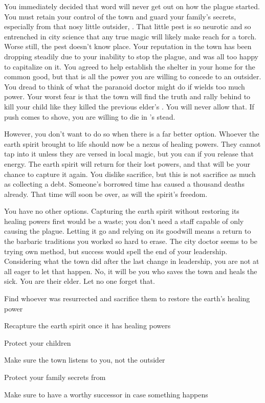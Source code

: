 \documentclass[char]{Pestilence}
\begin{document}
You immediately decided that word will never get out on how the plague started. You must retain your control of the town and guard your family's secrets, especially from that nosy little outsider, \cOutsider{}. That little pest is so neurotic and so entrenched in \cOutsider{\their} city science that any true magic will likely make \cOutsider{\them} reach for a torch. Worse still, the pest doesn't know \cOutsider{\their} place. Your reputation in the town has been dropping steadily due to your inability to stop the plague, and \cOutsider{} was all too happy to capitalize on it. You agreed to help \cOutsider{\them} establish the shelter in your home for the common good, but that is all the power you are willing to concede to an outsider. You dread to think of what the paranoid doctor might do if \cOutsider{\they} wields too much power. Your worst fear is that the town will find the truth and rally behind \cOutsider{\them} to kill your child like they killed the previous elder's \cPlaguebearer{\offspring}. You will never allow that. If push comes to shove, you are willing to die in \cRebel{}'s stead. 

However, you don't want to do so when there is a far better option. Whoever the earth spirit brought to life should now be a nexus of healing powers. They cannot tap into it unless they are versed in local magic, but you can if you release that energy. The earth spirit will return for their lost powers, and that will be your chance to capture it again. You dislike sacrifice, but this is not sacrifice as much as collecting a debt. Someone's borrowed time has caused a thousand deaths already. That time will soon be over, as will the spirit's freedom. 

You have no other options. Capturing the earth spirit without restoring its healing powers first would be a waste; you don't need a staff capable of only causing the plague. Letting it go and relying on its goodwill means a return to the barbaric traditions you worked so hard to erase. The city doctor seems to be trying \cOutsider{\their} own method, but \cOutsider{\their} success would spell the end of your leadership. Considering what the town did after the last change in leadership, you are not at all eager to let that happen. No, it will be you who saves the town and heals the sick. You are their elder. Let no one forget that.

\begin{itemz}[Goals]
	\item Find whoever was resurrected and sacrifice them to restore the earth's healing power
	\item Recapture the earth spirit once it has healing powers
	\item Protect your children
	\item Make sure the town listens to you, not the outsider
	\item Protect your family secrets from \cOutsider{}
	\item Make sure to have a worthy successor in case something happens
\end{itemz} 
\end{document}
